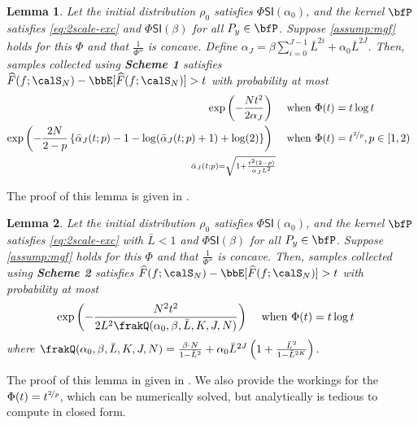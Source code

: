 \documentclass[11pt]{article}
\newtheorem{lemma}{Lemma}[section]
\newcounter{ct}
\newcommand{\PhiSI}[1]{\Phi\mathsf{SI}\left(#1\right)}
\begin{document}
\begin{lemma}
\label{lem:scheme1-chernoff}
Let the initial distribution \(\rho_{0}\) satisfies \(\PhiSI{\alpha_{0}}\), and the kernel \(\bfP\) satisfies \ref{eq:2scale-exc} and \(\PhiSI{\beta}\) for all \(P_{y} \in \bfP\).
Suppose \cref{assump:mgf} holds for this \(\Phi\) and that \(\frac{1}{\Phi''}\) is concave.
Define \(\alpha_{J} = \beta \sum_{i=0}^{J- 1}\bar{L}^{2i} + \alpha_{0}\bar{L}^{2J}\).
Then, samples collected using \textbf{Scheme 1} satisfies \(\widehat{F}(f; \calS_{N}) - \bbE[\widehat{F}(f; \calS_{N})] > t\) with probability at most
\begin{align*}
\exp\left(-\frac{Nt^{2}}{2\alpha_{J}}\right)~ &\quad \text{when } \Phi(t) = t\log t \\
\exp\left(-\frac{2N}{2 - p}\left\{\bar{\alpha}_{J}(t; p) - 1 - \log(\bar{\alpha}_{J}(t; p) + 1) + \log(2)\right\}\right)~ &\quad \text{when } \Phi(t) = t^{\nicefrac{2}{p}}, p \in [1, 2) \enskip \\
{\scriptstyle \bar{\alpha}_{J}(t; p) = \sqrt{1 + \frac{t^{2}(2 - p)}{\alpha_{J}L^{2}}}}
\end{align*}
\end{lemma}
The proof of this lemma is given in .

\begin{lemma}
\label{lem:scheme2-chernoff}
Let the initial distribution \(\rho_{0}\) satisfies \(\PhiSI{\alpha_{0}}\), and the kernel \(\bfP\) satisfies \ref{eq:2scale-exc} with \(\bar{L} < 1\) and \(\PhiSI{\beta}\) for all \(P_{y} \in \bfP\).
Suppose \cref{assump:mgf} holds for this \(\Phi\) and that \(\frac{1}{\Phi''}\) is concave.
Then, samples collected using \textbf{Scheme 2} satisfies \(\widehat{F}(f; \calS_{N}) - \bbE[\widehat{F}(f; \calS_{N})] > t\) with probability at most
\begin{align*}
\exp\left(-\frac{N^{2}t^{2}}{2L^{2}\frakQ(\alpha_{0}, \beta, \bar{L}, K, J, N)}\right)~ &\quad \text{when } \Phi(t) = t\log t
\end{align*}
where \(\frakQ(\alpha_{0}, \beta, \bar{L}, K, J, N) = \frac{\beta \cdot N}{1 - \bar{L}^{2}} + \alpha_{0}\bar{L}^{2J}\left(1 + \frac{\bar{L}^{2}}{1 - \bar{L}^{2K}} \right)\).
\end{lemma}

The proof of this lemma in given in .
We also provide the workings for the \(\Phi(t) = t^{\nicefrac{2}{p}}\), which can be numerically solved, but analytically is tedious to compute in closed form.
\end{document}
